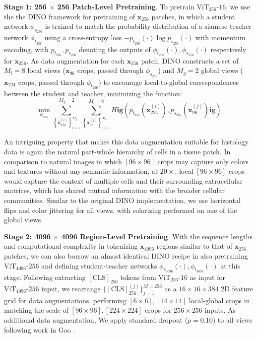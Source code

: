 {\textbf{Stage 1: 256 $\times$ 256 Patch-Level Pretraining}. To pretrain $\operatorname{ViT_{256}\textrm{-}16}$, we use the the DINO framework for pretraining of $\mathbf{x}_{256}$ patches, in which a student network $\phi_{s_{256}}$ is trained to match the probability distribution of a siamese teacher network $\phi_{t_{256}}$ using a cross-entropy loss $-p_{t_{256}}(\cdot) \operatorname{log} p_{s_{256}}(\cdot)$ with momentum encoding, with $p_{t_{256}}, p_{s_{256}}$ denoting the outputs of $\phi_{t_{256}}(\cdot), \phi_{s_{256}}(\cdot)$ respectively for $\mathbf{\mathbf{x}}_{256}$. As data augmentation for each $\mathbf{x}_{256}$ patch, DINO constructs a set of $M_l = 8$ local views ($\mathbf{x}_{96}$ crops, passed through $\phi_{s_{256}}$) and $M_g = 2$ global views ($\mathbf{x}_{224}$ crops, passed through $\phi_{t_{256}}$) to encourage local-to-global correspondences between the student and teacher, minimizing the function: $$
\min _{\theta_{s_{256}}} \sum_{\left\{\mathbf{x}_{224}^{(i)}\right\}_{i=1}^{M_g}}^{M_g = 2} \sum_{\left\{\mathbf{x}_{96}^{(j)}\right\}_{j=1}^{M_l}}^{M_l = 8} H \mathbf{ig}( p_{t_{256}}(\mathbf{x}_{224}^{(i)}), p_{s_{256}}\left(\mathbf{x}_{96}^{(j)}\right) \mathbf{ig})
$$

An intriguing property that makes this data augmentation suitable for histology data is again the natural part-whole hierarchy of cells in a tissue patch. In comparison to natural images in which $[96 \times 96]$ crops may capture only colors and textures without any semantic information, at $20\times$, local $[96 \times 96]$ crops would capture the context of multiple cells and their surrounding extracellular matrices, which has shared mutual information with the broader cellular communities. Similar to the original DINO implementation, we use horizontal flips and color jittering for all views, with solarizing performed on one of the global views.

\textbf{Stage 2: 4096 $\times$ 4096 Region-Level Pretraining}. With the sequence lengths and computational complexity in tokenizing $\mathbf{x}_{4096}$ regions similar to that of $\mathbf{x}_{256}$ patches, we can also borrow an almost identical DINO recipe in also pretraining $\operatorname{ViT_{4096}\textrm{-}256}$ and defining student-teacher networks $\phi_{s_{4096}}(\cdot), \phi_{t_{4096}}(\cdot)$ at this stage. Following extracting $\operatorname{[CLS]}_{256}$ tokens from $\operatorname{ViT_{256}\textrm{-}16}$ as input for $\operatorname{ViT_{4096}\textrm{-}256}$ input, we rearrange $\{\operatorname{[CLS]}_{256}^{(j)}\}_{j=1}^{M=256}$  as a $16 \times 16 \times 384$ 2D feature grid for data augmentations, performing $[6 \times 6], [14 \times 14]$ local-global crops in matching the scale of $[96 \times 96], [224 \times 224]$ crops for $256 \times 256$ inputs. As additional data augmentation, We apply standard dropout ($p=0.10$) to all views following work in Gao \etal\cite{gao-etal-2021-simcse}.

}
